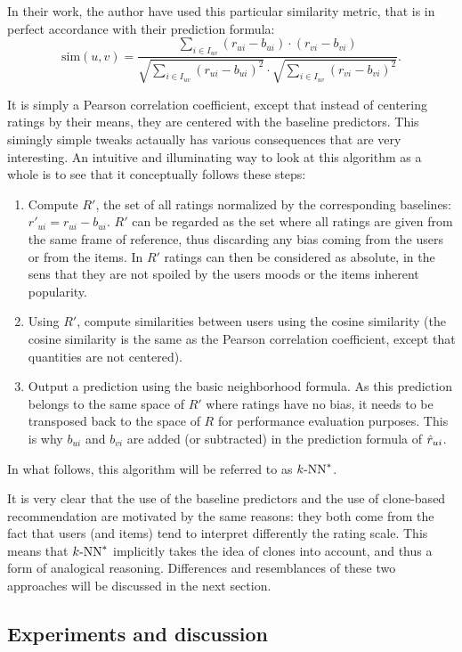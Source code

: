 In their work, the author have used this particular similarity metric, that is
in perfect accordance with their prediction formula:
$$\text{sim}(u, v) = \frac
{ \sum\limits_{i \in I_{uv}} (r_{ui} -  b_{ui}) \cdot (r_{vi} - b_{vi})}
{\sqrt{\sum\limits_{i \in I_{uv}} (r_{ui} -  b_{ui})^2} \cdot
\sqrt{\sum\limits_{i \in I_{uv}} (r_{vi} -  b_{vi})^2}}.$$

It is simply a Pearson correlation coefficient, except that instead of
centering ratings by their means, they are centered with the baseline
predictors. This simingly simple tweaks actaually has various consequences that
are very interesting. An intuitive and illuminating way to look at this
algorithm as a whole is to see that it conceptually follows these steps:
\begin{enumerate}
  \item Compute $R'$, the set of all ratings normalized by the corresponding
    baselines: $r'_{ui} = r_{ui} - b_{ui}$.  $R'$ can be regarded as the set
    where all ratings are given from the same frame of reference, thus
    discarding any bias coming from the users or from the items. In $R'$
    ratings can then be considered as absolute, in the sens that they are not
    spoiled by the users moods or the items inherent popularity.
  \item Using $R'$, compute similarities between users using the cosine
    similarity (the cosine similarity is the same as the Pearson correlation
    coefficient, except that quantities are not centered).
  \item Output a prediction using the basic neighborhood formula. As this
    prediction belongs to the same space of $R'$ where ratings have no bias, it
    needs to be transposed back to the space of $R$ for performance evaluation
    purposes. This is why $b_{ui}$ and $b_{vi}$ are added (or subtracted) in
    the prediction formula of $\hat{r}_{ui}$.
\end{enumerate}
\noindent
In what follows, this algorithm will be referred to as $k\text{-NN}^*$.

It is very clear that the use of the baseline predictors and the use of
clone-based recommendation are motivated by the same reasons: they both come
from the fact that users (and items) tend to interpret differently the rating
scale.  This means that $k\text{-NN}^*$ implicitly takes the idea of clones into
account, and thus a form of analogical reasoning.  Differences and resemblances
of these two approaches will be discussed in the next section.

\subsection{Experiments and discussion}
\label{expeDiscuss}

